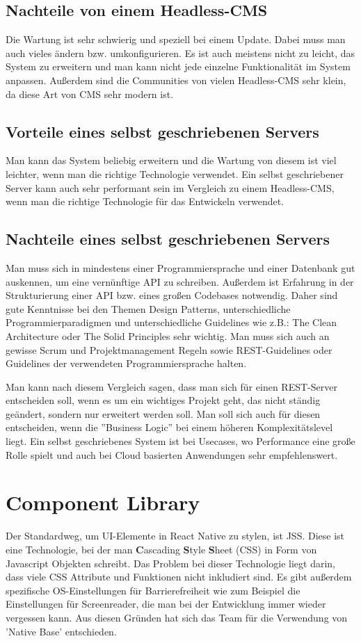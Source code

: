 \subsection{Nachteile von einem Headless-CMS}

Die Wartung ist sehr schwierig und speziell bei einem Update. Dabei muss man auch vieles ändern bzw. umkonfigurieren.
Es ist auch meistens nicht zu leicht, das System zu erweitern und man kann nicht jede einzelne Funktionalität im System anpassen.
Außerdem sind die Communities von vielen Headless-CMS sehr klein, da diese Art von CMS sehr modern ist.

\subsection{Vorteile eines selbst geschriebenen Servers}
Man kann das System beliebig erweitern und die Wartung von diesem ist viel leichter, wenn man die richtige Technologie
verwendet. Ein selbst geschriebener Server kann auch sehr performant sein im Vergleich zu einem Headless-CMS, wenn
man die richtige Technologie für das Entwickeln verwendet.

\subsection{Nachteile eines selbst geschriebenen Servers}
Man muss sich in mindestens einer Programmiersprache und einer Datenbank gut auskennen,
um eine vernünftige API zu schreiben.
Außerdem ist Erfahrung in der Strukturierung einer API bzw. eines großen Codebases notwendig.
Daher sind gute Kenntnisse bei den Themen Design Patterns, unterschiedliche Programmierparadigmen und unterschiedliche
Guidelines wie z.B.: The Clean Architecture oder The Solid Principles sehr wichtig. Man muss sich auch an gewisse
Scrum und Projektmanagement Regeln sowie REST-Guidelines oder Guidelines der verwendeten Programmiersprache halten.


Man kann nach diesem Vergleich sagen, dass man sich für einen REST-Server entscheiden soll, wenn es um ein wichtiges
Projekt geht, das nicht ständig geändert, sondern nur erweitert werden soll.
Man soll sich auch für diesen entscheiden, wenn die ''Business Logic'' bei einem höheren Komplexitätslevel liegt. Ein
selbst geschriebenes System ist bei Usecases, wo Performance eine große Rolle spielt und auch bei Cloud basierten
Anwendungen sehr empfehlenswert.

\section{Component Library}
Der Standardweg, um UI-Elemente in React Native zu stylen, ist JSS. Diese ist eine Technologie, bei der man \textbf{C}ascading \textbf{S}tyle \textbf{S}heet (CSS)
in Form von Javascript Objekten schreibt. Das Problem bei dieser Technologie liegt darin,
dass viele CSS Attribute und Funktionen nicht inkludiert sind. Es gibt außerdem spezifische OS-Einstellungen für Barrierefreiheit wie zum Beispiel die Einstellungen für Screenreader,
die man bei der Entwicklung immer wieder vergessen kann.
Aus diesen Gründen hat sich das Team für die Verwendung von 'Native Base' entschieden.



